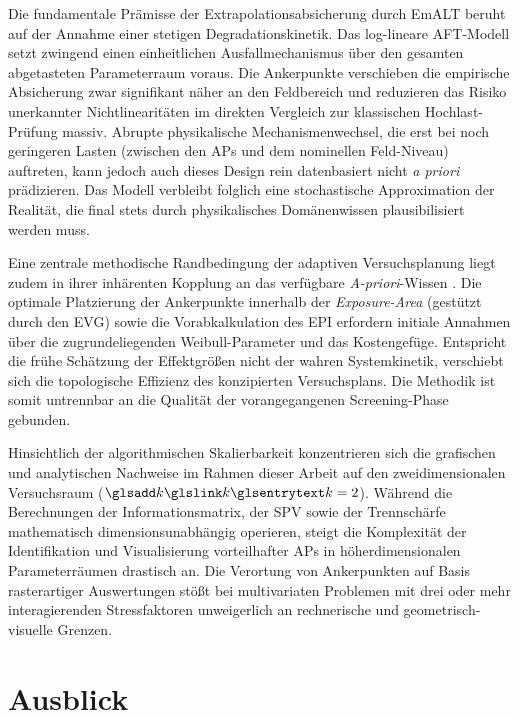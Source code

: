 Die fundamentale Prämisse der Extrapolationsabsicherung durch \ac{EmALT} beruht auf der Annahme einer stetigen Degradationskinetik.
Das log-lineare \ac{AFT}-Modell setzt zwingend einen einheitlichen Ausfallmechanismus über den gesamten abgetasteten Parameterraum voraus.
Die Ankerpunkte verschieben die empirische Absicherung zwar signifikant näher an den Feldbereich und reduzieren das Risiko unerkannter Nichtlinearitäten im direkten Vergleich zur klassischen Hochlast-Prüfung massiv.
Abrupte physikalische Mechanismenwechsel, die erst bei noch geringeren Lasten (zwischen den \acp{AP} und dem nominellen Feld-Niveau) auftreten, kann jedoch auch dieses Design rein datenbasiert nicht \textit{a priori} prädizieren.
Das Modell verbleibt folglich eine stochastische Approximation der Realität, die final stets durch physikalisches Domänenwissen plausibilisiert werden muss.

Eine zentrale methodische Randbedingung der adaptiven Versuchsplanung liegt zudem in ihrer inhärenten Kopplung an das verfügbare \textit{A-priori}-Wissen \cite{Khuri.2006}.
Die optimale Platzierung der Ankerpunkte innerhalb der \textit{Exposure-Area} (gestützt durch den \ac{EVG}) sowie die Vorabkalkulation des \ac{EPI} erfordern initiale Annahmen über die zugrundeliegenden Weibull-Parameter und das Kostengefüge.
Entspricht die frühe Schätzung der Effektgrößen nicht der wahren Systemkinetik, verschiebt sich die topologische Effizienz des konzipierten Versuchsplans.
Die Methodik ist somit untrennbar an die Qualität der vorangegangenen Screening-Phase gebunden.

Hinsichtlich der algorithmischen Skalierbarkeit konzentrieren sich die grafischen und analytischen Nachweise im Rahmen dieser Arbeit auf den zweidimensionalen Versuchsraum ($\sym{k}=2$).
Während die Berechnungen der Informationsmatrix, der \ac{SPV} sowie der Trennschärfe mathematisch dimensionsunabhängig operieren, steigt die Komplexität der Identifikation und Visualisierung vorteilhafter \acp{AP} in höherdimensionalen Parameterräumen drastisch an.
Die Verortung von Ankerpunkten auf Basis rasterartiger Auswertungen stößt bei multivariaten Problemen mit drei oder mehr interagierenden Stressfaktoren unweigerlich an rechnerische und geometrisch-visuelle Grenzen.

\section{Ausblick} \label{sec:fazit_ausblick}

